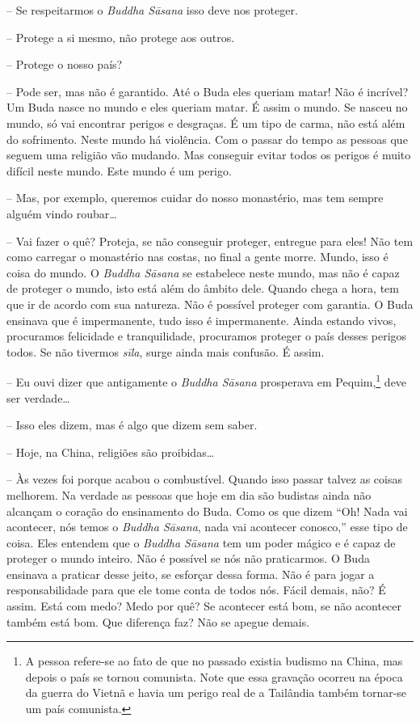 -- Se respeitarmos o \emph{Buddha Sāsana} isso deve nos
proteger.

-- Protege a si mesmo, não protege aos outros.

-- Protege o nosso país?

-- Pode ser, mas não é garantido. Até o Buda eles queriam matar!
Não é incrível? Um Buda nasce no mundo e eles queriam matar. É assim o
mundo. Se nasceu no mundo, só vai encontrar perigos e desgraças. É um
tipo de carma, não está além do sofrimento. Neste mundo há violência.
Com o passar do tempo as pessoas que seguem uma religião vão mudando.
Mas conseguir evitar todos os perigos é muito difícil neste mundo. Este
mundo é um perigo.

-- Mas, por exemplo, queremos cuidar do nosso monastério, mas tem
sempre alguém vindo roubar\ldots{}

-- Vai fazer o quê? Proteja, se não conseguir proteger, entregue
para eles! Não tem como carregar o monastério nas costas, no final a
gente morre. Mundo, isso é coisa do mundo. O \emph{Buddha Sāsana}
se estabelece neste mundo, mas não é capaz de proteger o mundo, isto
está além do âmbito dele. Quando chega a hora, tem que ir de acordo com
sua natureza. Não é possível proteger com garantia. O Buda ensinava que
é impermanente, tudo isso é impermanente. Ainda estando vivos,
procuramos felicidade e tranquilidade, procuramos proteger o país
desses perigos todos. Se não tivermos \emph{sīla}, surge ainda
mais confusão. É assim.

-- Eu ouvi dizer que antigamente o \emph{Buddha Sāsana
}prosperava em Pequim,\footnote{A pessoa refere-se ao fato de que no
passado existia budismo na China, mas depois o país se tornou
comunista. Note que essa gravação ocorreu na época da guerra do Vietnã
e havia um perigo real de a Tailândia também tornar-se um país
comunista.} deve ser verdade\ldots{}

-- Isso eles dizem, mas é algo que dizem sem saber.

-- Hoje, na China, religiões são proibidas\ldots{}

-- Às vezes foi porque acabou o combustível. Quando isso passar
talvez as coisas melhorem. Na verdade as pessoas que hoje em dia são
budistas ainda não alcançam o coração do ensinamento do Buda. Como os
que dizem “Oh! Nada vai acontecer, nós temos o \emph{Buddha
Sāsana}, nada vai acontecer conosco,” esse tipo de coisa. Eles
entendem que o \emph{Buddha Sāsana} tem um poder mágico e é capaz
de proteger o mundo inteiro. Não é possível se nós não praticarmos. O
Buda ensinava a praticar desse jeito, se esforçar dessa forma. Não é
para jogar a responsabilidade para que ele tome conta de todos nós.
Fácil demais, não? É assim. Está com medo? Medo por quê? Se acontecer
está bom, se não acontecer também está bom. Que diferença faz? Não se
apegue demais.


